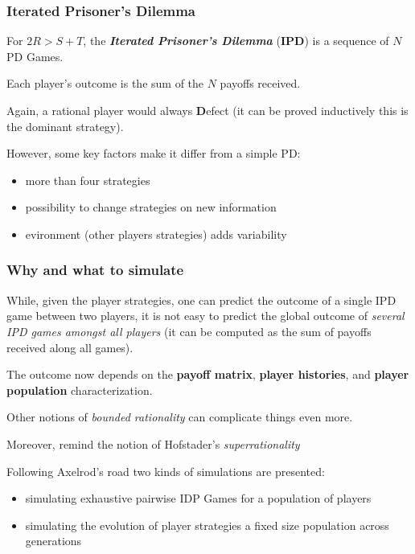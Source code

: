 \documentclass[xcolor={usenames,dvipsnames,svgnames}, compress]{beamer}
\begin{document}
\begin{frame}
  \frametitle{Iterated Prisoner's Dilemma}
  For $2R > S + T$, the \emph{\textbf{Iterated Prisoner's Dilemma}}
  (\textbf{IPD}) is a sequence of $N$ PD Games.

  Each player's
  outcome is the sum of the $N$ payoffs received.\par\bigskip

  Again, a rational player would always \textbf{D}efect (it can be
  proved inductively this is the dominant strategy).\par\bigskip

  However, some key factors make it differ from a simple PD:
  \begin{itemize}
  \item more than four strategies
  \item possibility to change strategies on new information
    \item evironment (other players strategies) adds variability
  \end{itemize}
\end{frame}

\begin{frame}
  \frametitle{Why and what to simulate}
  While, given the player strategies, one can predict the outcome of a
  single IPD game between two players,
  it is not easy to predict the global outcome of \emph{several IPD games
  amongst
  all players} (it can be computed as the sum of payoffs received
along all games).\par\bigskip


The outcome now depends on the \textbf{payoff matrix}, \textbf{player histories}, and
\textbf{player population }characterization.\par\bigskip 


  Other notions of \emph{bounded rationality} can complicate things
  even more.

  Moreover, remind the notion of Hofstader's
  \emph{superrationality}\par\bigskip

  Following Axelrod's road two kinds of simulations are presented:
  \begin{itemize}
  \item simulating exhaustive pairwise IDP Games for a population of
    players
  \item simulating the evolution of player strategies a fixed size population across generations  
  \end{itemize}
\end{frame}
\end{document}

